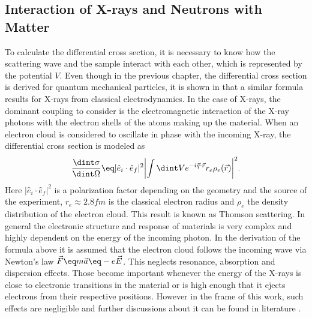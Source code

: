 \documentclass[\main/dresen_thesis.tex]{subfiles}
\begin{document}
  \subsection{Interaction of X-rays and Neutrons with Matter}\label{sec:theoreticalBackground:scattering:interactionWithMatter}
    To calculate the differential cross section, it is necessary to know how the scattering wave and the sample interact with each other, which is represented by the potential $V$.
    Even though in the previous chapter, the differential cross section is derived for quantum mechanical particles, it is shown in  that a similar formula results for X-rays from classical electrodynamics.
    In the case of X-rays, the dominant coupling to consider is the electromagnetic interaction of the X-ray photons with the electron shells of the atoms making up the material.
    When an electron cloud is considered to oscillate in phase with the incoming X-ray, the differential cross section is modeled as
    \begin{align}
      \frac{\dint \sigma}{\dint \Omega} \eq |\hat{e}_i \cdot \hat{e}_f|^2 \biggl| \int \dint V e^{-i \vec{q} \cdot \vec{r}}  r_e \rho_e (\vec{r}) \biggr|^2.
    \end{align}
    Here $|\hat{e}_i \cdot \hat{e}_f|^2$ is a polarization factor depending on the geometry and the source of the experiment, $r_e \approx 2.8 \unit{fm}$ is the classical electron radius and $\rho_e$ the density distribution of the electron cloud.
    This result is known as Thomson scattering.
    In general the electronic structure and response of materials is very complex and highly dependent on the energy of the incoming photon.
    In the derivation of the formula above it is assumed that the electron cloud follows the incoming wave via Newton's law $\vec{F} \eq m \vec{a} \eq -e\vec{E}$.
    This neglects resonance, absorption and dispersion effects.
    Those become important whenever the energy of the X-rays is close to electronic transitions in the material or is high enough that it  ejects electrons from their respective positions.
    However in the frame of this work, such effects are negligible and further discussions about it can be found in literature \cite{AlsNielsen_2011_Eleme}.
\end{document}
